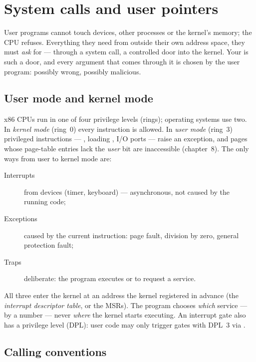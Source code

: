 \chapter{System calls and user pointers}
\label{ch:syscalls}

User programs cannot touch devices, other processes or the kernel's
memory; the CPU refuses. Everything they need from outside their own
address space, they must \emph{ask} for --- through a system call, a
controlled door into the kernel. Your  is such a
door, and every argument that comes through it is chosen by the user
program: possibly wrong, possibly malicious.

\section{User mode and kernel mode}

x86 CPUs run in one of four privilege levels (rings); operating systems
use two. In \emph{kernel mode} (ring~0) every instruction is allowed. In
\emph{user mode} (ring~3) privileged instructions --- ,
loading , I/O ports --- raise an exception, and pages whose
page-table entries lack the \emph{user} bit are inaccessible
(chapter~8). The only ways from user to kernel mode are:

\begin{description}
  \item[Interrupts] from devices (timer, keyboard) --- asynchronous, not
    caused by the running code;
  \item[Exceptions] caused by the current instruction: page fault,
    division by zero, general protection fault;
  \item[Traps] deliberate: the program executes  or
     to request a service.
\end{description}

All three enter the kernel at an address the kernel registered in advance
(the \emph{interrupt descriptor table}, or the  MSRs). The
program chooses \emph{which} service --- by a number --- never \emph{where}
the kernel starts executing. An interrupt gate also has a privilege level
(DPL): user code may only trigger gates with DPL~3 via .

\section{Calling conventions}

